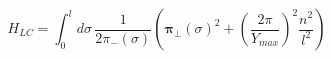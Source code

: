 \begin{equation}
  H_{LC} = \int_0^l d\sigma \, \frac{1}{2\pi_-(\sigma)}
           \left(
                     \bm{\pi}_{\perp}(\sigma)^2 +
                     \left(\frac{2\pi}{Y_{max}}\right)^2
                     \frac{n^2}{l^2}
           \right)
\end{equation}

